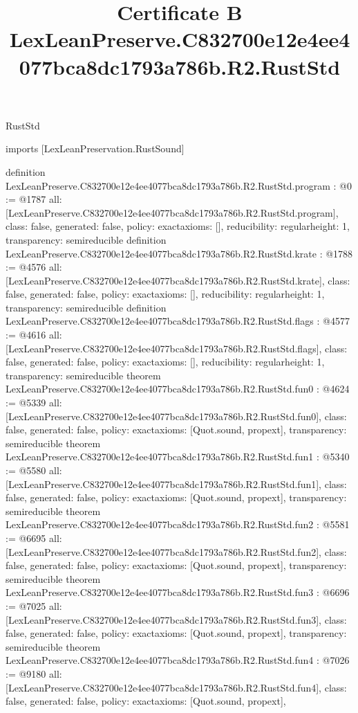 \begin{lexlean}{RustStd}
\title{Certificate B LexLeanPreserve.C832700e12e4ee4077bca8dc1793a786b.R2.RustStd}
\begin{coremodule}
imports [LexLeanPreservation.RustSound]

definition LexLeanPreserve.C832700e12e4ee4077bca8dc1793a786b.R2.RustStd.program : @0 := @1787 {
  all: [LexLeanPreserve.C832700e12e4ee4077bca8dc1793a786b.R2.RustStd.program],
  class: false,
  generated: false,
  policy: exact{axioms: []},
  reducibility: regular{height: 1},
  transparency: semireducible
}
definition LexLeanPreserve.C832700e12e4ee4077bca8dc1793a786b.R2.RustStd.krate : @1788 := @4576 {
  all: [LexLeanPreserve.C832700e12e4ee4077bca8dc1793a786b.R2.RustStd.krate],
  class: false,
  generated: false,
  policy: exact{axioms: []},
  reducibility: regular{height: 1},
  transparency: semireducible
}
definition LexLeanPreserve.C832700e12e4ee4077bca8dc1793a786b.R2.RustStd.flags : @4577 := @4616 {
  all: [LexLeanPreserve.C832700e12e4ee4077bca8dc1793a786b.R2.RustStd.flags],
  class: false,
  generated: false,
  policy: exact{axioms: []},
  reducibility: regular{height: 1},
  transparency: semireducible
}
theorem LexLeanPreserve.C832700e12e4ee4077bca8dc1793a786b.R2.RustStd.fun0 : @4624 := @5339 {
  all: [LexLeanPreserve.C832700e12e4ee4077bca8dc1793a786b.R2.RustStd.fun0],
  class: false,
  generated: false,
  policy: exact{axioms: [Quot.sound, propext]},
  transparency: semireducible
}
theorem LexLeanPreserve.C832700e12e4ee4077bca8dc1793a786b.R2.RustStd.fun1 : @5340 := @5580 {
  all: [LexLeanPreserve.C832700e12e4ee4077bca8dc1793a786b.R2.RustStd.fun1],
  class: false,
  generated: false,
  policy: exact{axioms: [Quot.sound, propext]},
  transparency: semireducible
}
theorem LexLeanPreserve.C832700e12e4ee4077bca8dc1793a786b.R2.RustStd.fun2 : @5581 := @6695 {
  all: [LexLeanPreserve.C832700e12e4ee4077bca8dc1793a786b.R2.RustStd.fun2],
  class: false,
  generated: false,
  policy: exact{axioms: [Quot.sound, propext]},
  transparency: semireducible
}
theorem LexLeanPreserve.C832700e12e4ee4077bca8dc1793a786b.R2.RustStd.fun3 : @6696 := @7025 {
  all: [LexLeanPreserve.C832700e12e4ee4077bca8dc1793a786b.R2.RustStd.fun3],
  class: false,
  generated: false,
  policy: exact{axioms: [Quot.sound, propext]},
  transparency: semireducible
}
theorem LexLeanPreserve.C832700e12e4ee4077bca8dc1793a786b.R2.RustStd.fun4 : @7026 := @9180 {
  all: [LexLeanPreserve.C832700e12e4ee4077bca8dc1793a786b.R2.RustStd.fun4],
  class: false,
  generated: false,
  policy: exact{axioms: [Quot.sound, propext]},
}
\end{coremodule}
\end{lexlean}
